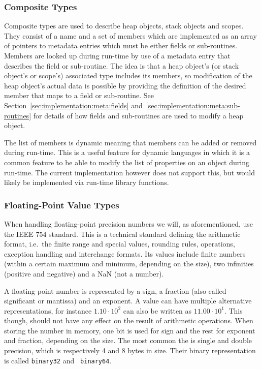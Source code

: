 
\subsubsection{Composite Types}

Composite types are used to describe heap objects, stack objects and
scopes. They consist of a name and a set of members which are implemented as an
array of pointers to metadata entries which must be either fields or
sub-routines. Members are looked up during run-time by use of a metadata entry
that describes the field or sub-routine. The idea is that a heap object's (or
stack object's or scope's) associated type includes its members, so modification
of the heap object's actual data is possible by providing the definition of the
desired member that maps to a field or sub-routine. See
Section~\ref{sec:implementation:meta:fields}
and~\ref{sec:implementation:meta:sub-routines} for details of how fields and
sub-routines are used to modify a heap object.

The list of members is dynamic meaning that members can be added or removed
during run-time. This is a useful feature for dynamic languages in which it is a
common feature to be able to modify the list of properties on an object during
run-time. The current implementation however does not support this, but would
likely be implemented via run-time library functions.

\subsubsection{Floating-Point Value Types}

When handling floating-point precision numbers we will, as aforementioned, use
the IEEE 754 standard\cite{ieee754}. This is a technical standard defining the
arithmetic format, i.e.~the finite range and special values, rounding rules,
operations, exception handling and interchange formats. Its values include
finite numbers (within a certain maximum and minimum, depending on the size),
two infinities (positive and negative) and a NaN (not a number).

A floating-point number is represented by a sign, a fraction (also called
significant or mantissa) and an exponent. A value can have multiple alternative
representations, for instance $1.10 \cdot 10^2$ can also be written as
$11.00 \cdot 10^1$. This though, should not have any effect on the result of
arithmetic operations. When storing the number in memory, one bit is used for
sign and the rest for exponent and fraction, depending on the size. The most
common the is single and double precision, which is respectively 4 and 8 bytes
in size. Their binary representation is called {\tt binary32} and {\tt
  binary64}.

